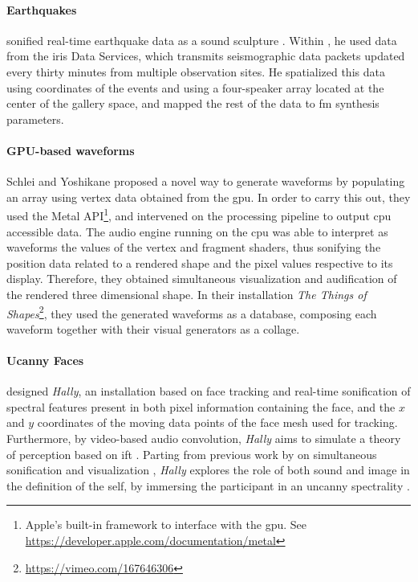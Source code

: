 \paragraph{Earthquakes}
\citeauthor{icmc/bbp2372.2017.033} sonified real-time earthquake data as a sound sculpture \parencite{icmc/bbp2372.2017.033}. Within , he used data from the \gls{iris} Data Services, which transmits seismographic data packets updated every thirty minutes from multiple observation sites. He spatialized this data using coordinates of the events and using a four-speaker array located at the center of the gallery space, and mapped the rest of the data to \gls{fm} synthesis parameters.

\paragraph{GPU-based waveforms}
Schlei and Yoshikane \parencite{icmc/bbp2372.2016.056} proposed a novel way to generate waveforms by populating an array using vertex data obtained from the \gls{gpu}. In order to carry this out, they used the Metal API\footnote{Apple's built-in framework to interface with the \gls{gpu}. See \url{https://developer.apple.com/documentation/metal}}, and intervened on the processing pipeline to output \gls{cpu} accessible data. The audio engine running on the \gls{cpu} was able to interpret as waveforms the values of the vertex and fragment shaders, thus sonifying the position data related to a rendered shape and the pixel values respective to its display. Therefore, they obtained simultaneous visualization and audification of the rendered three dimensional shape. In their installation \textit{The Things of Shapes}\footnote{\url{https://vimeo.com/167646306}}, they used the generated waveforms as a database, composing each waveform together with their visual generators as a collage.

\paragraph{Ucanny Faces}
\citeauthor{fdch/installation/spectral} \parencite{fdch/installation/spectral} designed \textit{Hally}, an installation based on face tracking and real-time sonification of spectral features present in both pixel information containing the face, and the $x$ and $y$ coordinates of the moving data points of the face mesh used for tracking. Furthermore, by video-based audio convolution, \textit{Hally} aims to simulate a theory of perception based on \gls{ift} \parencite{connes:shapes}. Parting from previous work by \citeauthor{Sch07:How} on simultaneous sonification and visualization \parencite{Sch07:How}, \textit{Hally} explores the role of both sound and image in the definition of the self, by immersing the participant in an uncanny spectrality \parencite{fdch/papers/spectral}.


